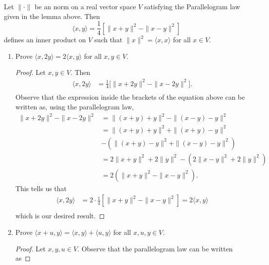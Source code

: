 \documentclass[a4paper]{article}
\begin{document}
\begin{lemma}
    Let \( \|\cdot\| \) be an norm on a real vector space \( V  \) satisfying the Parallelogram law given in the lemma above. Then  
    \[  \langle x , y \rangle = \frac{ 1 }{ 4 } [ \|x + y\|^{2} - \|x - y\|^{2}]  \]
    defines an inner product on \( V  \) such that \( \|x\|^{2} = \langle x , x \rangle \) for all \( x \in V  \).
\end{lemma}

\begin{enumerate}
    \item[(a)] Prove \( \langle x , 2y \rangle  = 2 \langle x , y \rangle \) for all \( x,y \in V  \). 
        \begin{proof}
        Let \( x,y \in V  \). Then
        \begin{align*}
            \langle x , 2y \rangle &= \frac{ 1 }{ 4 } \Big[ \|x + 2y\|^{2} - \|x - 2y\|^{2} \Big].  \\
        \end{align*}
        Observe that the expression inside the brackets of the equation above can be written as, using the parallelogram law, 
        \begin{align*}
            \|x + 2y\|^{2} - \|x - 2y\|^{2} &= \| (x+y) + y\|^{2} - \| (x-y) - y\|^{2} \\
                                            &=  \| (x+y) + y\|^{2} + \| (x+y) - y\|^{2}  \\ 
                                            &- (\|(x+y) - y\|^{2} + \| (x-y) - y\|^{2}) \\
                                            &=  2 \|x + y\|^{2} + 2 \|y\|^{2} - (2 \|x -y\|^{2} + 2 \|y\|^{2}) \\
                                            &= 2 (\|x + y\|^{2} - \|x -y\|^{2}).
        \end{align*}
        This tells us that 
        \begin{align*}
            \langle x , 2y \rangle &= 2 \cdot \frac{ 1 }{ 4 } [\|x + y\|^{2} - \|x -y\|^{2}] = 2 \langle x  , y \rangle   \\
        \end{align*}
        which is our desired result.
        \end{proof}
    \item[(b)] Prove \( \langle x + u  ,  y  \rangle = \langle x  , y \rangle + \langle u , y \rangle  \) for all \( x ,u,y \in V  \).
        \begin{proof}
        Let \( x,y, u \in V  \). Observe that the parallelogram law can be written as 

\end{proof}
\end{enumerate}
\end{document}
